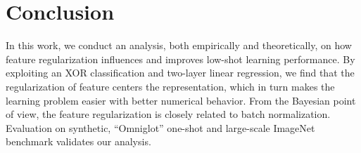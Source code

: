 \section{Conclusion}
\label{sec:conclusion}
In this work, we conduct an analysis, both empirically and theoretically, on how feature regularization influences and improves low-shot learning performance. By exploiting an XOR	classification and two-layer linear regression, we find that the regularization of feature centers the representation, which in turn makes the learning problem easier with better numerical behavior. From the Bayesian point of view, the feature regularization is closely related to batch normalization. Evaluation on synthetic, ``Omniglot'' one-shot and large-scale ImageNet benchmark validates our analysis.

